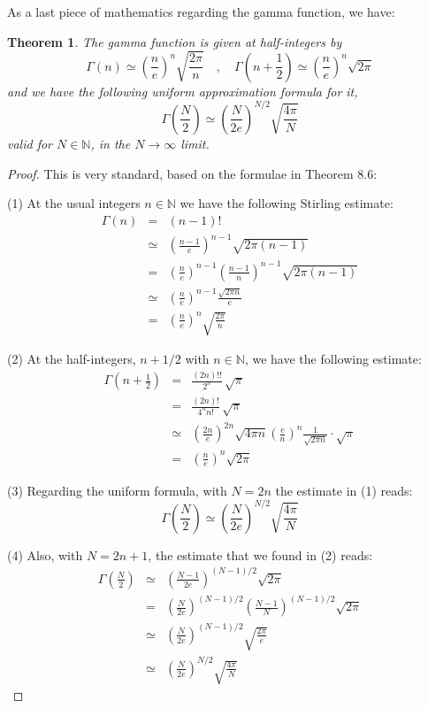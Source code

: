 \documentclass[12pt]{amsbook}
\newtheorem{theorem}{Theorem}[chapter]
\begin{document}
As a last piece of mathematics regarding the gamma function, we have:


\begin{theorem}
The gamma function is given at half-integers by
$$\Gamma(n)\simeq\left(\frac{n}{e}\right)^n\sqrt{\frac{2\pi}{n}}
\quad,\quad\Gamma\left(n+\frac{1}{2}\right)\simeq\left(\frac{n}{e}\right)^n\sqrt{2\pi}$$
and we have the following uniform approximation formula for it,
$$\Gamma\left(\frac{N}{2}\right)\simeq\left(\frac{N}{2e}\right)^{N/2}\sqrt{\frac{4\pi}{N}}$$
valid for $N\in\mathbb N$, in the $N\to\infty$ limit.
\end{theorem}

\begin{proof}
This is very standard, based on the formulae in Theorem 8.6:

\medskip

(1) At the usual integers $n\in\mathbb N$ we have the following Stirling estimate:
\begin{eqnarray*}
\Gamma(n)
&=&(n-1)!\\
&\simeq&\left(\frac{n-1}{e}\right)^{n-1}\sqrt{2\pi(n-1)}\\
&=&\left(\frac{n}{e}\right)^{n-1}\left(\frac{n-1}{n}\right)^{n-1}\sqrt{2\pi(n-1)}\\
&\simeq&\left(\frac{n}{e}\right)^{n-1}\frac{\sqrt{2\pi n}}{e}\\
&=&\left(\frac{n}{e}\right)^n\sqrt{\frac{2\pi}{n}}
\end{eqnarray*}

(2) At the half-integers, $n+1/2$ with $n\in\mathbb N$, we have the following estimate:
\begin{eqnarray*}
\Gamma\left(n+\frac{1}{2}\right)
&=&\frac{(2n)!!}{2^n}\,\sqrt{\pi}\\
&=&\frac{(2n)!}{4^nn!}\,\sqrt{\pi}\\
&\simeq&\left(\frac{2n}{e}\right)^{2n}\sqrt{4\pi n}\left(\frac{e}{n}\right)^n\frac{1}{\sqrt{2\pi n}}\cdot\sqrt{\pi}\\
&=&\left(\frac{n}{e}\right)^n\sqrt{2\pi}
\end{eqnarray*}

(3) Regarding the uniform formula, with $N=2n$ the estimate in (1) reads:
$$\Gamma\left(\frac{N}{2}\right)\simeq\left(\frac{N}{2e}\right)^{N/2}\sqrt{\frac{4\pi}{N}}$$

(4) Also, with $N=2n+1$, the estimate that we found in (2) reads:
\begin{eqnarray*}
\Gamma\left(\frac{N}{2}\right)
&\simeq&\left(\frac{N-1}{2e}\right)^{(N-1)/2}\sqrt{2\pi}\\
&=&\left(\frac{N}{2e}\right)^{(N-1)/2}\left(\frac{N-1}{N}\right)^{(N-1)/2}\sqrt{2\pi}\\
&\simeq&\left(\frac{N}{2e}\right)^{(N-1)/2}\sqrt{\frac{2\pi}{e}}\\
&\simeq&\left(\frac{N}{2e}\right)^{N/2}\sqrt{\frac{4\pi}{N}}
\end{eqnarray*}


\end{proof}
\end{document}

